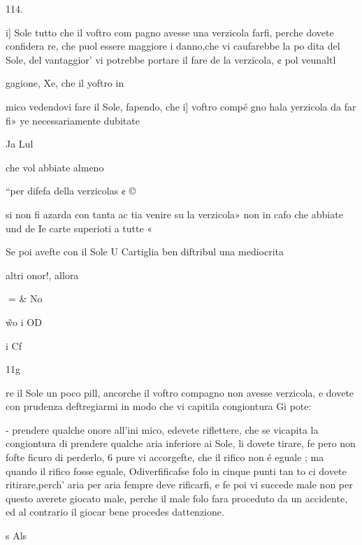\documentclass[11pt,a6paper]{article}
\begin{document}
 

 

 

 

 

 

 

114.

i] Sole tutto che il voftro com
pagno avesse una verzicola
farfi, perche dovete confidera
re, che puol essere maggiore i
danno,che vi caufarebbe la po
dita del Sole, del vantaggior’
vi potrebbe portare il fare de
la verzicola, ¢ pol veunaltl

gagione, Xe, che il yoftro in

mico vedendovi fare il Sole,
fapendo, che i] voftro compé
gno hala yerzicola da far fi»
ye necessariamente dubitate

Ja Lul

che vol abbiate almeno

“per difefa della verzicolas ¢ ©

si non fi azarda con tanta ac
tia venire su la verzicola»
non in cafo che abbiate und de
Ie carte superioti a tutte «

Se poi avefte con il Sole U
Cartiglia ben diftribul
una mediocrita

altri onor!, allora

 
= & No

\~ wo i OD

i
Cf

11g

re il Sole un poco pill, ancorche
il voftro compagno non avesse
verzicola, e dovete con prudenza deftregiarmi in modo che
vi capitila congiontura Gi pote:

- prendere qualche onore all’ini
mico, edevete riflettere, che
se vicapita la congiontura di
prendere qualche aria inferiore
ai Sole, li dovete tirare, fe pero non fofte ficuro di perderlo,
6 pure vi accorgefte, che il
rifico non é eguale ; ma quando
il rifico fosse eguale, Odiverfificafse folo in cinque punti tan
to ci dovete ritirare,perch’ aria
per aria fempre deve rificarfi, e
fe poi vi succede male non per
questo averete giocato male,
perche il male folo fara proceduto da un accidente, ed al contrario il giocar bene procedes
dattenzione.

s Als

 

 

 

 
 

 
\end{document}
